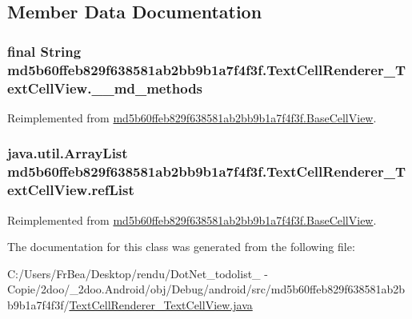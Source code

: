 \subsection{Member Data Documentation}
\hypertarget{classmd5b60ffeb829f638581ab2bb9b1a7f4f3f_1_1_text_cell_renderer___text_cell_view_00b3617596bc3d87d289d2fa7895a853}{
\subsubsection[{\_\-\_\-md\_\-methods}]{\setlength{\rightskip}{0pt plus 5cm}final String {\bf md5b60ffeb829f638581ab2bb9b1a7f4f3f.TextCellRenderer\_\-TextCellView.\_\-\_\-md\_\-methods}}}
\label{classmd5b60ffeb829f638581ab2bb9b1a7f4f3f_1_1_text_cell_renderer___text_cell_view_00b3617596bc3d87d289d2fa7895a853}




Reimplemented from \hyperlink{classmd5b60ffeb829f638581ab2bb9b1a7f4f3f_1_1_base_cell_view_b45ff8d3fd40dd0e56aafff804b441ea}{md5b60ffeb829f638581ab2bb9b1a7f4f3f.BaseCellView}.\hypertarget{classmd5b60ffeb829f638581ab2bb9b1a7f4f3f_1_1_text_cell_renderer___text_cell_view_f83f0ccc30bfc43d4b87f8e0bc0790c4}{
\subsubsection[{refList}]{\setlength{\rightskip}{0pt plus 5cm}java.util.ArrayList {\bf md5b60ffeb829f638581ab2bb9b1a7f4f3f.TextCellRenderer\_\-TextCellView.refList}}}
\label{classmd5b60ffeb829f638581ab2bb9b1a7f4f3f_1_1_text_cell_renderer___text_cell_view_f83f0ccc30bfc43d4b87f8e0bc0790c4}




Reimplemented from \hyperlink{classmd5b60ffeb829f638581ab2bb9b1a7f4f3f_1_1_base_cell_view_da428ae06aa11eb73b64b1723a81985b}{md5b60ffeb829f638581ab2bb9b1a7f4f3f.BaseCellView}.

The documentation for this class was generated from the following file:\begin{CompactItemize}
\item 
C:/Users/FrBea/Desktop/rendu/DotNet\_\-todolist\_ - Copie/2doo/\_\-2doo.Android/obj/Debug/android/src/md5b60ffeb829f638581ab2bb9b1a7f4f3f/\hyperlink{_text_cell_renderer___text_cell_view_8java}{TextCellRenderer\_\-TextCellView.java}\end{CompactItemize}
